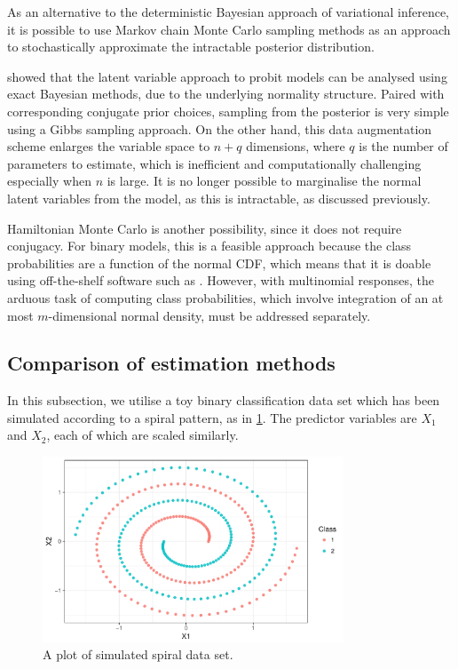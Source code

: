 As an alternative to the deterministic Bayesian approach of variational inference, it is possible to use Markov chain Monte Carlo sampling methods as an approach to stochastically approximate the intractable posterior distribution.

\citet{albert1993bayesian} showed that the latent variable approach to probit models can be analysed using exact Bayesian methods, due to the underlying normality structure.
Paired with corresponding conjugate prior choices, sampling from the posterior is very simple using a Gibbs sampling approach.
On the other hand, this data augmentation scheme enlarges the variable space to $n+q$ dimensions, where $q$ is the number of parameters to estimate, which is inefficient and computationally challenging especially when $n$ is large.
It is no longer possible to marginalise the normal latent variables from the model, as this is intractable, as discussed previously.

Hamiltonian Monte Carlo is another possibility, since it does not require conjugacy.
For binary models, this is a feasible approach because the class probabilities are a function of the normal CDF, which means that it is doable using off-the-shelf software such as .
However, with multinomial responses, the arduous task of computing class probabilities, which involve integration of an at most $m$-dimensional normal density, must be addressed separately.


\subsection{Comparison of estimation methods}

In this subsection, we utilise a toy binary classification data set which has been simulated according to a spiral pattern, as in \cref{fig:exampleiprobit}.
The predictor variables are $X_1$ and $X_2$, each of which are scaled similarly.

\begin{figure}[hbt]
  \centering
  \includegraphics[width=0.8\textwidth]{figure/05-example_data}
  \caption{A plot of simulated spiral data set.}
  \label{fig:exampleiprobit}
\end{figure}

